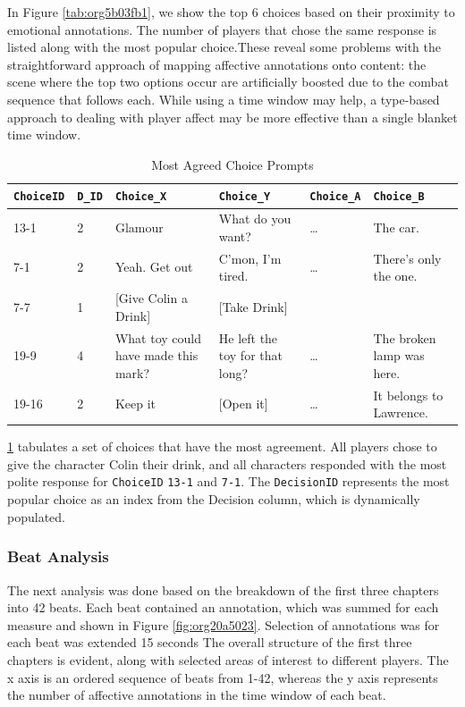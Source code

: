 In Figure \ref{tab:org5b03fb1}, we show the top 6 choices based on their
proximity to emotional annotations. The number of players that chose
the same response is listed along with the most popular choice.These
reveal some problems with the straightforward approach of mapping
affective annotations onto content: the scene where the top two
options occur are artificially boosted due to the combat sequence that
follows each. While using a time window may help, a type-based
approach to dealing with player affect may be more effective than a
single blanket time window.

\begin{table}[htbp]
\caption{\label{tab:orgc2d7f73}
Most Agreed Choice Prompts}
\centering
\begin{tabular}{llllll}
\texttt{ChoiceID} & \texttt{D\_ID} & \texttt{Choice\_X} & \texttt{Choice\_Y} & \texttt{Choice\_A} & \texttt{Choice\_B}\\
\hline
13-1 & 2 & Glamour & What do you want? & \ldots{} & The car.\\
7-1 & 2 & Yeah. Get out & C'mon, I'm tired. & \ldots{} & There's only the one.\\
7-7 & 1 & [Give Colin a Drink] & [Take Drink] &  & \\
19-9 & 4 & What toy could have made this mark? & He left the toy for that long? & \ldots{} & The broken lamp was here.\\
19-16 & 2 & Keep it & [Open it] & \ldots{} & It belongs to Lawrence.\\
\end{tabular}
\end{table}


\ref{tab:orgc2d7f73} tabulates a set of choices that have the most
agreement. All players chose to give the character Colin their drink,
and all characters responded with the most polite response for
\texttt{ChoiceID} \texttt{13-1} and \texttt{7-1}. The \texttt{DecisionID} represents the most popular
choice as an index from the Decision column, which is dynamically
populated.

\subsubsection{Beat Analysis}
\label{sec:org01da7a0}
The next analysis was done based on the breakdown of the first three
chapters into 42 beats. Each beat contained an annotation, which was
summed for each measure and shown in Figure
\ref{fig:org20a5023}. Selection of annotations was for each beat
was extended 15 seconds The overall structure of the first three
chapters is evident, along with selected areas of interest to
different players. The x axis is an ordered sequence of beats from
1-42, whereas the y axis represents the number of affective
annotations in the time window of each beat.

